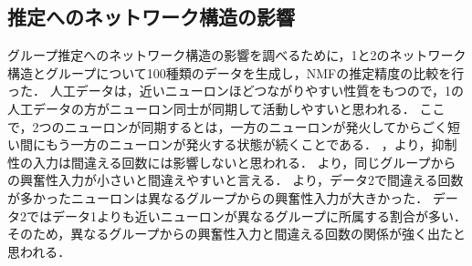 \subsection{推定へのネットワーク構造の影響}
グループ推定へのネットワーク構造の影響を調べるために，1と2のネットワーク構造とグループについて100種類のデータを生成し，NMFの推定精度の比較を行った．
人工データは，近いニューロンほどつながりやすい性質をもつので，1の人工データの方がニューロン同士が同期して活動しやすいと思われる．
ここで，2つのニューロンが同期するとは，一方のニューロンが発火してからごく短い間にもう一方のニューロンが発火する状態が続くことである．
，より，抑制性の入力は間違える回数には影響しないと思われる．
より，同じグループからの興奮性入力が小さいと間違えやすいと言える．
より，データ2で間違える回数が多かったニューロンは異なるグループからの興奮性入力が大きかった．
データ2ではデータ1よりも近いニューロンが異なるグループに所属する割合が多い．
そのため，異なるグループからの興奮性入力と間違える回数の関係が強く出たと思われる．

